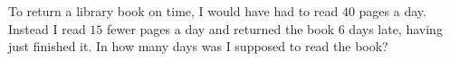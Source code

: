 To return a library book on time, I would have had to read $40$ pages a day. Instead I read $15$ fewer pages a day and returned the book $6$ days late, having just finished it. In how many days was I supposed to read the book?
